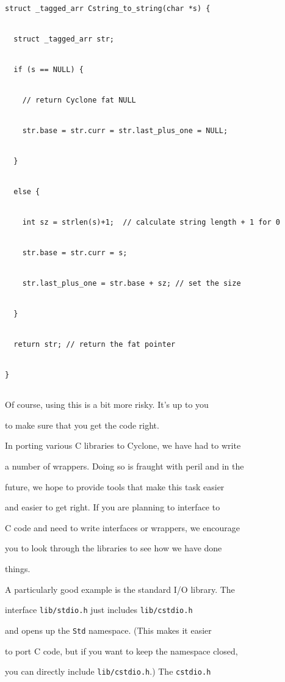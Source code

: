 \begin{verbatim}


struct _tagged_arr Cstring_to_string(char *s) {


  struct _tagged_arr str;


  if (s == NULL) {


    // return Cyclone fat NULL


    str.base = str.curr = str.last_plus_one = NULL;


  }


  else {


    int sz = strlen(s)+1;  // calculate string length + 1 for 0


    str.base = str.curr = s; 


    str.last_plus_one = str.base + sz; // set the size


  }


  return str; // return the fat pointer


}


\end{verbatim}


Of course, using this is a bit more risky.  It's up to you


to make sure that you get the code right.





In porting various C libraries to Cyclone, we have had to write


a number of wrappers.  Doing so is fraught with peril and in the


future, we hope to provide tools that make this task easier


and easier to get right.  If you are planning to interface to


C code and need to write interfaces or wrappers, we encourage


you to look through the libraries to see how we have done


things.  





A particularly good example is the standard I/O library.  The


interface \texttt{lib/stdio.h} just includes \texttt{lib/cstdio.h}


and opens up the \texttt{Std} namespace.  (This makes it easier


to port C code, but if you want to keep the namespace closed,


you can directly include \texttt{lib/cstdio.h}.)  The \texttt{cstdio.h}


